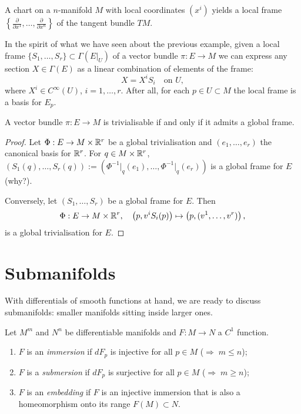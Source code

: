 \begin{example}
  A chart on a $n$-manifold $M$ with local coordinates $(x^i)$ yields a local frame $\left\{\frac{\partial}{\partial x^1}, \ldots, \frac{\partial}{\partial x^n}\right\}$ of the tangent bundle $TM$.
\end{example}

\begin{remark}
  In the spirit of what we have seen about the previous example, given a local frame $\{S_1, \ldots, S_r\}\subset\Gamma(E|_U)$ of a vector bundle $\pi: E \to M$ we can express any section $X\in\Gamma(E)$ as a linear combination of elements of the frame:
  \begin{equation}
    X = X^i S_i \quad\mbox{on }U,
  \end{equation}
  where $X^i\in C^\infty(U)$, $i=1,\ldots,r$.
  After all, for each $p\in U\subset M$ the local frame is a basis for $E_p$.
\end{remark}

\begin{proposition}\label{prop:trivialisable}
  A vector bundle $\pi: E\to M$ is trivialisable if and only if it admits a global frame.
\end{proposition}
\begin{proof}
  Let $\Phi: E \to M\times\mathbb{R}^r$ be a global trivialisation and $(e_1, \ldots, e_r)$ the canonical basis for $\mathbb{R}^r$.
  For $q\in M\times\mathbb{R}^r$, $(S_1(q), \ldots, S_r(q)) := \left(\Phi^{-1}\big|_q(e_1), \ldots, \Phi^{-1}\big|_q(e_r) \right)$ is a global frame for $E$ (why?).

  Conversely, let $(S_1, \ldots, S_r)$ be a global frame for $E$. Then
  \begin{equation}
    \Phi: E \to M\times\mathbb{R}^r, \quad
    \left(p, v^i S_i(p)\right) \mapsto \left(p, (v^1, \ldots, v^r)\right),
  \end{equation}
  is a global trivialisation for $E$.
\end{proof}
\section{Submanifolds}

With differentials of smooth functions at hand, we are ready to discuss submanifolds: smaller manifolds sitting inside larger ones.

\begin{definition}
  Let $M^m$ and $N^n$ be differentiable manifolds and $F:M\to N$ a $C^1$ function.
  \begin{enumerate}
    \item $F$ is an \emph{immersion} if $dF_p$ is injective for all $p\in M$ ($\Rightarrow\; m\leq n$);
    \item $F$ is a \emph{submersion} if $dF_p$ is surjective for all $p\in M$ ($\Rightarrow\; m\geq n$);
    \item $F$ is an \emph{embedding} if $F$ is an injective immersion that is also a homeomorphism onto its range $F(M)\subset N$.
  \end{enumerate}
\end{definition}

